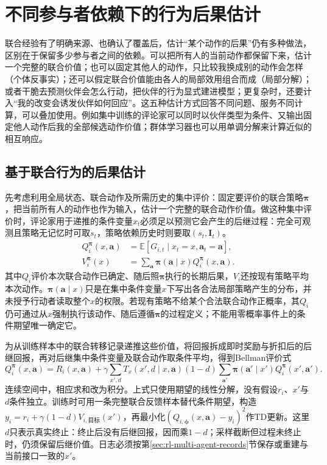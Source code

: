 \section{不同参与者依赖下的行为后果估计}
\label{sec:rl-multi-agent-estimation}

联合经验有了明确来源、也确认了覆盖后，估计“某个动作的后果”仍有多种做法，区别在于保留多少参与者之间的依赖。可以把所有人的当前动作都保留下来，估计一个完整的联合价值；也可以固定其他人的动作，只比较我换成别的动作会怎样（个体反事实）；还可以假定联合价值能由各人的局部效用组合而成（局部分解）；或者干脆去预测伙伴会怎么行动，把伙伴的行为显式建进模型；更复杂时，还要计入“我的改变会诱发伙伴如何回应”。这五种估计方式回答不同问题、服务不同计算，可以叠加使用。例如集中训练的评论家可以同时以伙伴类型为条件、又输出固定他人动作后我的全部候选动作价值；群体学习器也可以用单调分解来计算近似的相互响应。

\subsection{基于联合行为的后果估计}
\label{sec:rl-multi-agent-joint-value}

先考虑利用全局状态、联合动作及所需历史的集中评价：固定要评价的联合策略$\bm\pi$，把当前所有人的动作也作为输入，估计一个完整的联合动作价值。做这种集中评价时，评论家用于递推的条件变量$x_t$必须足以预测它会产生的后继过程：完全可观测且策略无记忆时可取$s_t$，策略依赖历史时则要取$(s_t,\bm I_t)$。
\begin{align}
 Q_i^{\bm\pi}(x,\bm a)
 &=\mathbb E[G_{i,t}\mid x_t=x,\bm a_t=\bm a],\\
 V_i^{\bm\pi}(x)
 &=\sum_{\bm a}\bm\pi(\bm a\mid x)Q_i^{\bm\pi}(x,\bm a).
\end{align}
其中$Q_i$评价本次联合动作已确定、随后照$\bm\pi$执行的长期后果，$V_i$还按现有策略平均本次动作。$\bm\pi(\bm a\mid x)$只是在集中条件变量$x$下写出各合法局部策略产生的分布，并未授予行动者读取整个$x$的权限。若现有策略不给某个合法联合动作正概率，其$Q_i$仍可通过从$x$强制执行该动作、随后遵循$\bm\pi$的过程定义；不能用零概率事件上的条件期望唯一确定它。

为从训练样本中的联合转移记录递推这些价值，将回报拆成即时奖励与折扣后的后继回报，再对后继集中条件变量及联合动作取条件平均，得到Bellman评价式
\begin{equation}
 Q_i^{\bm\pi}(x,\bm a)=R_i(x,\bm a)+
 \gamma\sum_{x',d}T_x(x',d\mid x,\bm a)(1-d)
       \sum_{\bm a'}\bm\pi(\bm a'\mid x')Q_i^{\bm\pi}(x',\bm a').
 \label{eq:rl-multi-agent-joint-bellman}
\end{equation}
连续空间中，相应求和改为积分。上式只使用期望的线性分解，没有假设$r_i$、$x'$与$d$条件独立。训练时可用一条完整联合反馈样本替代条件期望，构造
$y_i=r_i+\gamma(1-d)V_{i,\text{目标}}(x')$，再最小化$(Q_{i,\bm\phi}(x,\bm a)-y_i)^2$作TD更新。这里$d$只表示真实终止：终止后没有后继回报，因而乘$1-d$；采样截断但过程未终止时，仍须保留后继价值。日志必须按第\ref{sec:rl-multi-agent-records}节保存或重建与当前接口一致的$x'$。


